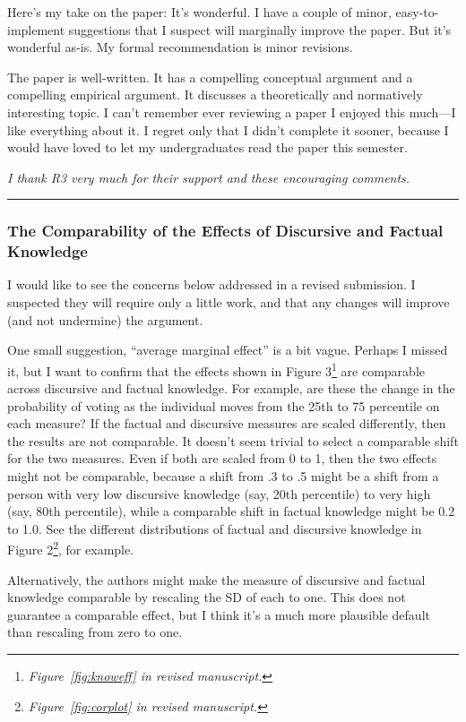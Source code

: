Here’s my take on the paper: It’s wonderful. I have a couple of minor, easy-to-implement suggestions that I suspect will marginally improve the paper. But it’s wonderful as-is. My formal recommendation is minor revisions.

The paper is well-written. It has a compelling conceptual argument and a compelling empirical argument. It discusses a theoretically and normatively interesting topic. I can’t remember ever reviewing a paper I enjoyed this much—I like everything about it. I regret only that I didn’t complete it sooner, because I would have loved to let my undergraduates read the paper this semester.

\textit{I thank R3 very much for their support and these encouraging comments.}

\rule{\linewidth}{.01cm}


\subsubsection*{The Comparability of the Effects of Discursive and Factual Knowledge}

I would like to see the concerns below addressed in a revised submission. I suspected they will require only a little work, and that any changes will improve (and not undermine) the argument. 

One small suggestion, ``average marginal effect'' is a bit vague. Perhaps I missed it, but I want to confirm that the effects shown in Figure 3\footnote{\textit{Figure~\ref{fig:knoweff} in revised manuscript.}} are comparable across discursive and factual knowledge. For example, are these the change in the probability of voting as the individual moves from the 25th to 75 percentile on each measure? If the factual and discursive measures are scaled differently, then the results are not comparable. It doesn’t seem trivial to select a comparable shift for the two measures. Even if both are scaled from 0 to 1, then the two effects might not be comparable, because a shift from .3 to .5 might be a shift from a person with very low discursive knowledge (say, 20th percentile) to very high (say, 80th percentile), while a comparable shift in factual knowledge might be 0.2 to 1.0. See the different distributions of factual and discursive knowledge in Figure 2\footnote{\textit{Figure~\ref{fig:corplot} in revised manuscript.}}, for example.

Alternatively, the authors might make the measure of discursive and factual knowledge comparable by rescaling the SD of each to one. This does not guarantee a comparable effect, but I think it’s a much more plausible default than rescaling from zero to one.

